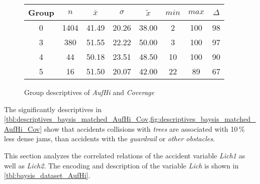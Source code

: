 \begin{figure}[ht!]
	\centering
	\begin{minipage}{0.5\textwidth}
		\tiny
		\setlength{\tabcolsep}{4pt}
		\centering
		\begin{tabular}{c|c|c|c|c|c|c|c}
			\toprule
			Group & $n$ & $\bar{x}$ & $\sigma$ & $\tilde{x}$ & $min$ & $max$ & $\Delta$ \\
			\midrule
			0 & 1404 & 41.49 & 20.26 & 38.00 & 2  & 100 & 98 \\ 
			3 & 380  & 51.55 & 22.22 & 50.00 & 3  & 100 & 97 \\ 
			4 & 44   & 50.18 & 23.51 & 48.50 & 10 & 100 & 90 \\ 
			5 & 16   & 51.50 & 20.07 & 42.00 & 22 & 89  & 67 \\  
			\bottomrule
		\end{tabular}
		\label{tbl:descriptives_baysis_matched_AufHi_Cov}
	\end{minipage}%
	\begin{minipage}{0.55\textwidth}
		\data 
        \pgfplotstablesort[sort key=mean, sort cmp=float >]{\datasorted}{\data}
        \tiny
        \centering
		\label{fig:descriptives_baysis_matched_AufHi_Cov}
	\end{minipage}%
	\caption{Group descriptives of \textit{AufHi} and \textit{Coverage}}
\end{figure}
The significantly descriptives in \cref{tbl:descriptives_baysis_matched_AufHi_Cov,fig:descriptives_baysis_matched_AufHi_Cov} show that accidents collisions with \textit{trees} are associated with 10\,\% less dense jams, than accidents with the \textit{guardrail} or \textit{other obstacles}.

This section analyzes the correlated relations of the accident variable \textit{Lich1} as well as \textit{Lich2}. The encoding and description of the variable \textit{Lich} is shown in \cref{tbl:baysis_dataset_AufHi}.

